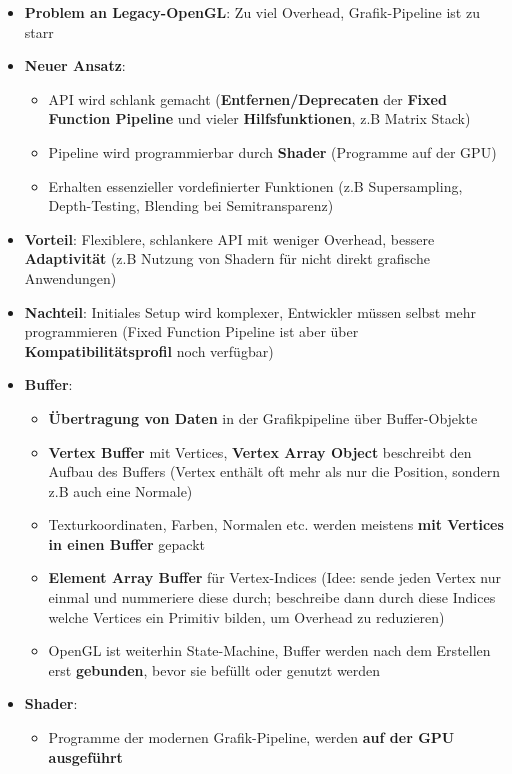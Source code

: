 \begin{itemize}
	\item \textbf{Problem an Legacy-OpenGL}: Zu viel Overhead, Grafik-Pipeline ist zu starr
	\item \textbf{Neuer Ansatz}:
	\begin{itemize}
		\item API wird schlank gemacht (\textbf{Entfernen/Deprecaten} der \textbf{Fixed Function Pipeline} und vieler \textbf{Hilfsfunktionen}, z.B Matrix Stack)
		\item Pipeline wird programmierbar durch \textbf{Shader} (Programme auf der GPU)
		\item Erhalten essenzieller vordefinierter Funktionen (z.B Supersampling, Depth-Testing, Blending bei Semitransparenz)
	\end{itemize}
	\item \textbf{Vorteil}: Flexiblere, schlankere API mit weniger Overhead, bessere \textbf{Adaptivität} (z.B Nutzung von Shadern für nicht direkt grafische Anwendungen)
	\item \textbf{Nachteil}: Initiales Setup wird komplexer, Entwickler müssen selbst mehr programmieren (Fixed Function Pipeline ist aber über \textbf{Kompatibilitätsprofil} noch verfügbar)
	\item \textbf{Buffer}:
	\begin{itemize}
		\item \textbf{Übertragung von Daten} in der Grafikpipeline über Buffer-Objekte
		\item \textbf{Vertex Buffer} mit Vertices, \textbf{Vertex Array Object} beschreibt den Aufbau des Buffers (Vertex enthält oft mehr als nur die Position, sondern z.B auch eine Normale)
		\item Texturkoordinaten, Farben, Normalen etc. werden meistens \textbf{mit Vertices in einen Buffer} gepackt
		\item \textbf{Element Array Buffer} für Vertex-Indices (Idee: sende jeden Vertex nur einmal und nummeriere diese durch; beschreibe dann durch diese Indices welche Vertices ein Primitiv bilden, um Overhead zu reduzieren)
		\item OpenGL ist weiterhin State-Machine, Buffer werden nach dem Erstellen erst \textbf{gebunden}, bevor sie befüllt oder genutzt werden
	\end{itemize}
	\item \textbf{Shader}:
	\begin{itemize}
		\item Programme der modernen Grafik-Pipeline, werden \textbf{auf der GPU ausgeführt}

\end{itemize}
\end{itemize}
